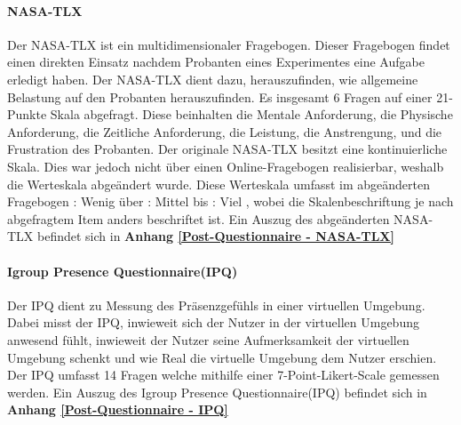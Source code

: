 \documentclass[a4paper,11pt]{article}%
\renewcommand{\\}{\vspace*{0.5\baselineskip} \newline}
\begin{document}

		\paragraph{NASA-TLX}
Der NASA-TLX ist ein multidimensionaler Fragebogen. Dieser Fragebogen findet einen direkten Einsatz nachdem Probanten eines Experimentes eine Aufgabe erledigt haben. Der NASA-TLX dient dazu, herauszufinden, wie allgemeine Belastung auf den Probanten herauszufinden.
Es insgesamt 6 Fragen auf einer 21-Punkte Skala abgefragt. Diese beinhalten die Mentale Anforderung, die Physische Anforderung, die Zeitliche Anforderung, die Leistung, die Anstrengung, und die Frustration des Probanten. \cite{NASATLX}
Der originale NASA-TLX besitzt eine kontinuierliche Skala. Dies war jedoch nicht über einen Online-Fragebogen realisierbar, weshalb die Werteskala abgeändert wurde. Diese Werteskala umfasst im abgeänderten Fragebogen : Wenig \frqq über : Mittel \frqq bis : Viel \frqq, wobei die Skalenbeschriftung je nach abgefragtem Item anders beschriftet ist.
\\Ein Auszug des abgeänderten NASA-TLX befindet sich in \textbf{Anhang \ref{Post-Questionnaire - NASA-TLX}}


		\paragraph{Igroup Presence Questionnaire(IPQ)}
Der IPQ dient zu Messung des Präsenzgefühls in einer virtuellen Umgebung. Dabei misst der IPQ, inwieweit sich der Nutzer in der virtuellen Umgebung anwesend fühlt, inwieweit der Nutzer seine Aufmerksamkeit der virtuellen Umgebung schenkt und wie Real die virtuelle Umgebung dem Nutzer erschien. Der IPQ umfasst 14 Fragen welche mithilfe einer 7-Point-Likert-Scale gemessen werden.
\\Ein Auszug des Igroup Presence Questionnaire(IPQ) befindet sich in \textbf{Anhang \ref{Post-Questionnaire - IPQ}}
		
\end{document}
